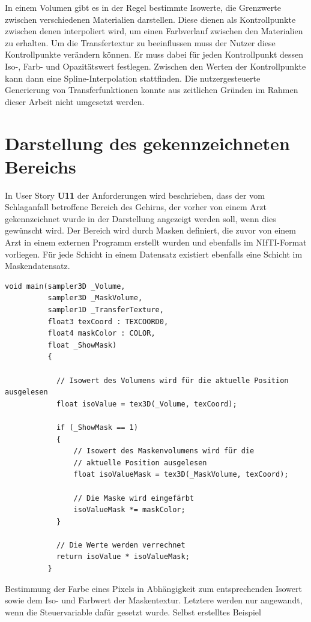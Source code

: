 In einem Volumen gibt es in der Regel bestimmte Isowerte, die Grenzwerte zwischen verschiedenen Materialien darstellen. Diese dienen als Kontrollpunkte zwischen denen interpoliert wird, um einen Farbverlauf zwischen den Materialien zu erhalten. 
Um die Transfertextur zu beeinflussen muss der Nutzer diese Kontrollpunkte verändern können. Er muss dabei für jeden Kontrollpunkt dessen Iso-, Farb- und Opazitätswert festlegen. Zwischen den Werten der Kontrollpunkte kann dann eine Spline-Interpolation stattfinden.
Die nutzergesteuerte Generierung von Transferfunktionen konnte aus zeitlichen Gründen im Rahmen dieser Arbeit nicht umgesetzt werden.


\section{Darstellung des gekennzeichneten Bereichs}
\label{maske}


In User Story \textbf{U11} der Anforderungen wird beschrieben, dass der vom Schlaganfall betroffene Bereich des Gehirns, der vorher von einem Arzt gekennzeichnet wurde in der Darstellung angezeigt werden soll, wenn dies gewünscht wird. 
Der Bereich wird durch Masken definiert, die zuvor von einem Arzt in einem externen Programm erstellt wurden und ebenfalls im NIfTI-Format vorliegen. Für jede Schicht in einem Datensatz existiert ebenfalls eine Schicht im Maskendatensatz. 

\begin{listing}[!htb]
\begin{verbatim}
void main(sampler3D _Volume,
		  sampler3D _MaskVolume,
          sampler1D _TransferTexture,
          float3 texCoord : TEXCOORD0,
          float4 maskColor : COLOR,
          float _ShowMask)
          {
          
          	// Isowert des Volumens wird für die aktuelle Position ausgelesen
          	float isoValue = tex3D(_Volume, texCoord);
          
          	if (_ShowMask == 1)
          	{
          		// Isowert des Maskenvolumens wird für die 
          		// aktuelle Position ausgelesen
          		float isoValueMask = tex3D(_MaskVolume, texCoord);
          	
          		// Die Maske wird eingefärbt
          		isoValueMask *= maskColor;
          	}
          
          	// Die Werte werden verrechnet
          	return isoValue * isoValueMask;
          }
\end{verbatim}
\caption{Bestimmung der Farbe eines Pixels in Abhängigkeit zum entsprechenden Isowert sowie dem Iso- und Farbwert der Maskentextur. Letztere werden nur angewandt, wenn die Steuervariable dafür gesetzt wurde. Selbst erstelltes Beispiel}
\label{lst:mask}
\end{listing}
\FloatBarrier

